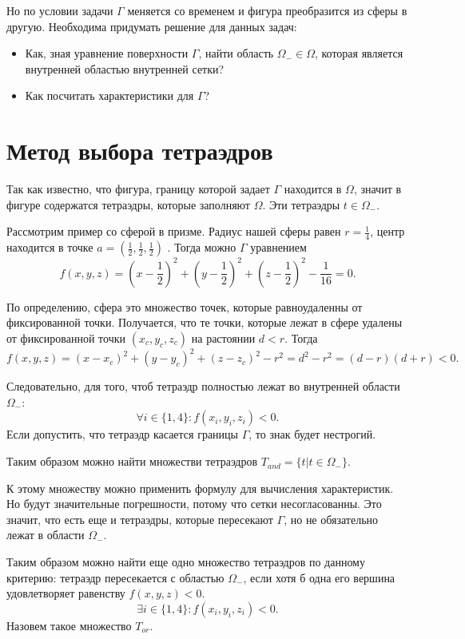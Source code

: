Но по условии задачи $\Gamma$ меняется со временем и фигура преобразится из сферы в другую. Необходима придумать решение для данных задач:
\begin{itemize}
    \item Как, зная уравнение поверхности $\Gamma$, найти область $\Omega_{-} \in \Omega$, которая является внутренней областью внутренней сетки? 
    \item Как посчитать характеристики для $\Gamma$?
\end{itemize}

\section{Метод выбора тетраэдров}

Так как известно, что фигура, границу которой задает $\Gamma$ находится в  $\Omega$, значит в фигуре содержатся тетраэдры, которые заполняют $\Omega$. Эти тетраэдры $t\in \Omega_{-}$. 

Рассмотрим пример со сферой в призме. Радиус нашей сферы равен $ r = \frac{1}{4}$, центр находится в точке $a = (\frac{1}{2},\frac{1}{2},\frac{1}{2}) $ . Тогда можно $\Gamma$ уравнением 
$$f(x,y,z) = (x-\frac{1}{2})^{2} + (y-\frac{1}{2})^{2} + (z-\frac{1}{2})^{2} - \frac{1}{16} = 0.$$

По определению, сфера это множество точек, которые равноудаленны от фиксированной точки. Получается, что те точки, которые лежат в сфере удалены от фиксированной точки $(x_{c},y_{c},z_{c})$ на растоянии $d < r$. Тогда 
$$f(x,y,z) = (x-x_{c})^{2} + (y-y_{c})^{2} + (z-z_{c})^{2} - r^{2} = d^{2} - r^{2} = (d - r)(d+r) < 0.$$

Следовательно, для того, чтоб тетраэдр полностью лежат во внутренней области $ \Omega_{-}$: 
$$\forall i \in \{1,4\} : f(x_{i},y_{i},z_{i}) < 0.$$
Если допустить, что тетраэдр касается границы $\Gamma$, то знак будет нестрогий.

Таким образом можно найти множестви тетраэдров $ T_{and} = \{t| t \in \Omega_{-}\}.$ 

К этому множеству можно применить формулу для вычисления характеристик. Но будут значительные погрешности, потому что сетки несогласованны. Это значит, что есть еще и тетраэдры, которые пересекают $\Gamma$, но не обязательно лежат в области $\Omega_{-}$. 

Таким образом можно найти еще одно множество тетраэдров по данному критерию: тетраэдр пересекается с областью $\Omega_{-}$, если хотя б одна его вершина удовлетворяет равенству $f(x,y,z) < 0$. 
$$\exists i \in \{1,4\} : f(x_{i},y_{i},z_{i}) < 0. $$
Назовем такое множество $ T_{or}$.

